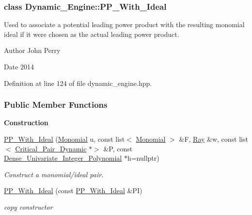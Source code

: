 \subsubsection{class Dynamic\+\_\+\+Engine\+:\+:P\+P\+\_\+\+With\+\_\+\+Ideal}
Used to associate a potential leading power product with the resulting monomial ideal if it were chosen as the actual leading power product. 

\begin{DoxyAuthor}{Author}
John Perry 
\end{DoxyAuthor}
\begin{DoxyDate}{Date}
2014 
\end{DoxyDate}


Definition at line 124 of file dynamic\+\_\+engine.\+hpp.

\subsubsection*{Public Member Functions}
\begin{Indent}\textbf{ Construction}\par
\begin{DoxyCompactItemize}
\item 
\hyperlink{group___g_b_computation_ab79e52cd576b29fc48e7d9ad49303ae7}{P\+P\+\_\+\+With\+\_\+\+Ideal} (\hyperlink{group__polygroup_class_monomial}{Monomial} u, const list$<$ \hyperlink{group__polygroup_class_monomial}{Monomial} $>$ \&F, \hyperlink{group___c_l_s_solvers_class_l_p___solvers_1_1_ray}{Ray} \&w, const list$<$ \hyperlink{group___g_b_computation_class_critical___pair___dynamic}{Critical\+\_\+\+Pair\+\_\+\+Dynamic} $\ast$$>$ \&P, const \hyperlink{group__polygroup_class_dense___univariate___integer___polynomial}{Dense\+\_\+\+Univariate\+\_\+\+Integer\+\_\+\+Polynomial} $\ast$h=nullptr)
\begin{DoxyCompactList}\small\item\em Construct a monomial/ideal pair. \end{DoxyCompactList}\item 
\mbox{\label{group___g_b_computation_ac71ad235934d824958a14443be77789e}} 
\hyperlink{group___g_b_computation_ac71ad235934d824958a14443be77789e}{P\+P\+\_\+\+With\+\_\+\+Ideal} (const \hyperlink{group___g_b_computation_class_dynamic___engine_1_1_p_p___with___ideal}{P\+P\+\_\+\+With\+\_\+\+Ideal} \&PI)
\begin{DoxyCompactList}\small\item\em copy constructor \end{DoxyCompactList}\end{DoxyCompactItemize}
\end{Indent}
